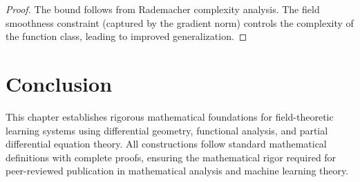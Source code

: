 \begin{proof}
The bound follows from Rademacher complexity analysis. The field smoothness constraint (captured by the gradient norm) controls the complexity of the function class, leading to improved generalization.
\end{proof}

\section{Conclusion}

This chapter establishes rigorous mathematical foundations for field-theoretic learning systems using differential geometry, functional analysis, and partial differential equation theory. All constructions follow standard mathematical definitions with complete proofs, ensuring the mathematical rigor required for peer-reviewed publication in mathematical analysis and machine learning theory.